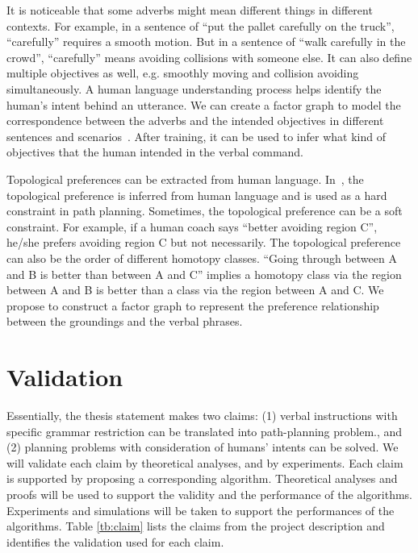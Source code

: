 \documentclass[phd]{byuprop}
\begin{document}
It is noticeable that some adverbs might mean different things in different contexts.
For example, in a sentence of ``put the pallet carefully on the truck'', ``carefully'' requires a smooth motion. 
But in a sentence of ``walk carefully in the crowd'', ``carefully'' means avoiding collisions with someone else.
It can also define multiple objectives as well, e.g. smoothly moving and collision avoiding simultaneously.
A human language understanding process helps identify the human's intent behind an utterance.
We can create a factor graph to model the correspondence between the adverbs and the intended objectives in different sentences and scenarios~\cite{tellex2011understanding}.
After training, it can be used to infer what kind of objectives that the human intended in the verbal command.

Topological preferences can be extracted from human language.
In~\cite{howard2014natural}, the topological preference is inferred from human language and is used as a hard constraint in path planning.
Sometimes, the topological preference can be a soft constraint.
For example, if a human coach says ``better avoiding region C'', he/she prefers avoiding region C but not necessarily.
The topological preference can also be the order of different homotopy classes.
``Going through between A and B is better than between A and C'' implies a homotopy class via the region between A and B is better than a class via the region between A and C.
We propose to construct a factor graph to represent the preference relationship between the groundings and the verbal phrases.


\section{Validation}
\label{sec:validation}

Essentially, the thesis statement makes two claims:
(1) verbal instructions with specific grammar restriction can be translated into path-planning problem.,
and (2) planning problems with  consideration of humans' intents can be solved.
We will validate each claim by theoretical analyses, and by experiments.
Each claim is supported by proposing a corresponding algorithm.
Theoretical analyses and proofs will be used to support the validity and the performance of the algorithms.
Experiments and simulations will be taken to support the performances of the algorithms.
Table \ref{tb:claim} lists the claims from the project description and identifies the validation used for each claim.
\end{document}
